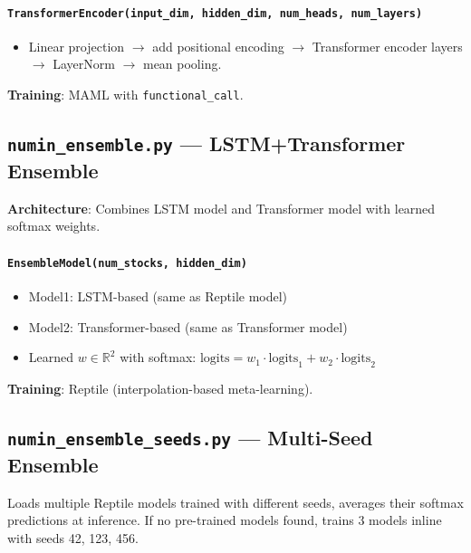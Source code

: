 \documentclass[11pt,a4paper]{article}
\begin{document}
\paragraph{\texttt{TransformerEncoder(input\_dim, hidden\_dim, num\_heads, num\_layers)}}
\begin{itemize}[nosep]
  \item Linear projection $\to$ add positional encoding $\to$ Transformer encoder layers $\to$ LayerNorm $\to$ mean pooling.
\end{itemize}
\textbf{Training}: MAML with \texttt{functional\_call}.

\subsection{\texttt{numin\_ensemble.py} --- LSTM+Transformer Ensemble}
\textbf{Architecture}: Combines LSTM model and Transformer model with learned softmax weights.

\paragraph{\texttt{EnsembleModel(num\_stocks, hidden\_dim)}}
\begin{itemize}[nosep]
  \item Model1: LSTM-based (same as Reptile model)
  \item Model2: Transformer-based (same as Transformer model)
  \item Learned $w \in \mathbb{R}^2$ with softmax: $\text{logits} = w_1 \cdot \text{logits}_1 + w_2 \cdot \text{logits}_2$
\end{itemize}
\textbf{Training}: Reptile (interpolation-based meta-learning).

\subsection{\texttt{numin\_ensemble\_seeds.py} --- Multi-Seed Ensemble}
Loads multiple Reptile models trained with different seeds, averages their softmax predictions at inference. If no pre-trained models found, trains 3 models inline with seeds 42, 123, 456.

\end{document}
